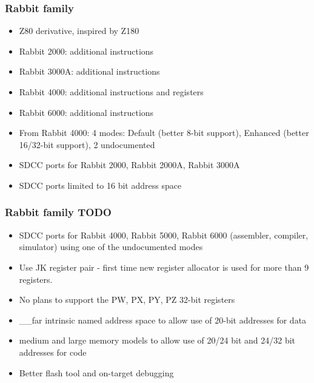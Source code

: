 \documentclass[xcolor=dvipsnames]{beamer}
\begin{document}
\begin{frame}
	\frametitle{Rabbit family}
	\begin{itemize}
		\item Z80 derivative, inspired by Z180
		\item Rabbit 2000: additional instructions
		\item Rabbit 3000A: additional instructions
		\item Rabbit 4000: additional instructions and registers
		\item Rabbit 6000: additional instructions
		\item From Rabbit 4000: 4 modes: Default (better 8-bit support), Enhanced (better 16/32-bit support), 2 undocumented
		\item SDCC ports for Rabbit 2000, Rabbit 2000A, Rabbit 3000A
		\item SDCC ports limited to 16 bit address space
	\end{itemize}
\end{frame}

\begin{frame}
	\frametitle{Rabbit family TODO}
	\begin{itemize}
		\item SDCC ports for Rabbit 4000, Rabbit 5000, Rabbit 6000 (assembler, compiler, simulator) using one of the undocumented modes
		\item Use JK register pair - first time new register allocator is used for more than 9 registers.
		\item No plans to support the PW, PX, PY, PZ 32-bit registers
		\item \_\_far intrinsic named address space to allow use of 20-bit addresses for data
		\item medium and large memory models to allow use of 20/24 bit and 24/32 bit addresses for code
		\item Better flash tool and on-target debugging
	\end{itemize}
\end{frame}
\end{document}

